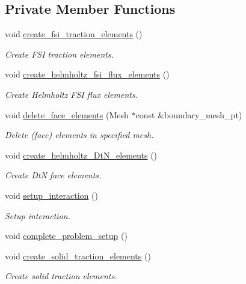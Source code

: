 \subsection*{Private Member Functions}
\begin{DoxyCompactItemize}
\item 
void \hyperlink{classCoatedDiskProblem_a143908e8db74ad6bd8b7efaaa26c78c3}{create\+\_\+fsi\+\_\+traction\+\_\+elements} ()
\begin{DoxyCompactList}\small\item\em Create F\+SI traction elements. \end{DoxyCompactList}\item 
void \hyperlink{classCoatedDiskProblem_a34f61c03b152f2ac06e1e771b0dbe09b}{create\+\_\+helmholtz\+\_\+fsi\+\_\+flux\+\_\+elements} ()
\begin{DoxyCompactList}\small\item\em Create Helmholtz F\+SI flux elements. \end{DoxyCompactList}\item 
void \hyperlink{classCoatedDiskProblem_a55b4cead41e01ab5fd728b607f62bb74}{delete\+\_\+face\+\_\+elements} (Mesh $\ast$const \&boundary\+\_\+mesh\+\_\+pt)
\begin{DoxyCompactList}\small\item\em Delete (face) elements in specified mesh. \end{DoxyCompactList}\item 
void \hyperlink{classCoatedDiskProblem_a222b74395afde602617965f60c885491}{create\+\_\+helmholtz\+\_\+\+Dt\+N\+\_\+elements} ()
\begin{DoxyCompactList}\small\item\em Create DtN face elements. \end{DoxyCompactList}\item 
void \hyperlink{classCoatedDiskProblem_ad24d43389155a6a9f2f66faf4b239c26}{setup\+\_\+interaction} ()
\begin{DoxyCompactList}\small\item\em Setup interaction. \end{DoxyCompactList}\item 
void \hyperlink{classCoatedDiskProblem_a4d63252d3916bda71f28b637d6590627}{complete\+\_\+problem\+\_\+setup} ()
\item 
void \hyperlink{classCoatedDiskProblem_a31c3707de78a720e3936e3b34e70b1ba}{create\+\_\+solid\+\_\+traction\+\_\+elements} ()
\begin{DoxyCompactList}\small\item\em Create solid traction elements. \end{DoxyCompactList}\item 

\end{DoxyCompactItemize}
